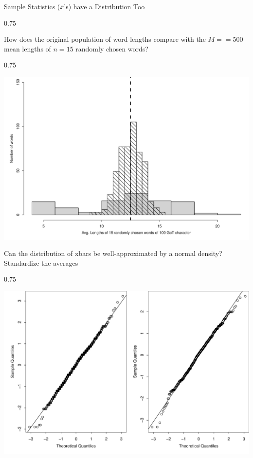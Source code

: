 \documentclass{beamer}\usepackage[]{graphicx}\usepackage[]{color}
\newenvironment{knitrout}{}{} %
\renewenvironment{knitrout}{\begin{spacing}{0.75}\begin{tiny}}{\end{tiny}\end{spacing}}
\newcommand{\xbar}{\overline{x}}
\begin{document}
\begin{frame}{Sample Statistics ($\xbar$'s) have a Distribution Too\;\;}
\begin{knitrout}
{}



\end{knitrout}

\newpage

How does the original population of word lengths compare
with the $M==500$ mean lengths of $n=15$ randomly chosen words?
\begin{knitrout}\small
{}\color{fgcolor}

{\centering \includegraphics[width=0.79\linewidth]{figure/graphics-unnamed-chunk-46-1} 

}



\end{knitrout}

\newpage

Can the distribution of xbars be well-approximated by a normal density?
Standardize the averages
\begin{knitrout}\small
{}\color{fgcolor}

{\centering \includegraphics[width=0.79\linewidth]{figure/graphics-unnamed-chunk-47-1} 

}
\end{knitrout}
\end{frame}
\end{document}
